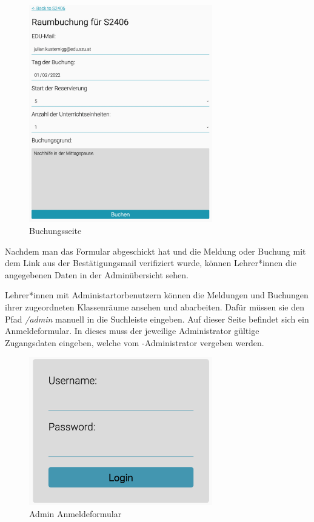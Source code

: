 \begin{figure}[H]
    \centering
    \includegraphics[width=80mm]{media/WebComponents/Buchungsseite_light.png}
    \caption{Buchungsseite}
\end{figure}

Nachdem man das Formular abgeschickt hat und die Meldung oder Buchung mit dem Link aus der Bestätigungsmail verifiziert wurde, können Lehrer*innen die angegebenen Daten in der Adminübersicht sehen.


Lehrer*innen mit Administartorbenutzern können die Meldungen und Buchungen ihrer zugeordneten Klassenräume ansehen und abarbeiten. Dafür müssen sie den Pfad \emph{/admin} manuell in die Suchleiste eingeben. Auf dieser Seite befindet sich ein Anmeldeformular. In dieses muss der jeweilige Administrator gültige Zugangsdaten eingeben, welche vom \ZELIA-Administrator vergeben werden. 

\begin{figure}[H]
    \centering
    \includegraphics[width=80mm]{media/WebComponents/Login_light.png}
    \caption{Admin Anmeldeformular}
\end{figure}

